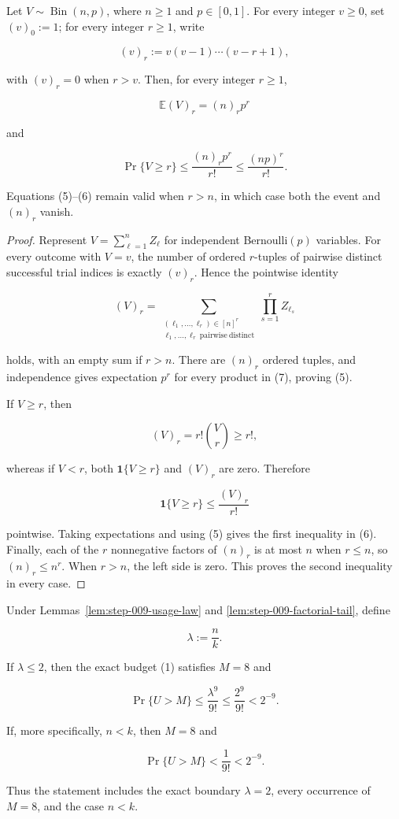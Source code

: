 \begin{lemma}\label{lem:step-009-factorial-tail}
Let \(V\sim\operatorname{Bin}(n,p)\), where \(n\ge1\) and
\(p\in[0,1]\). For every integer \(v\ge0\), set \((v)_0:=1\); for every
integer \(r\ge1\), write

\[
(v)_r:=v(v-1)\cdots(v-r+1),
\]

with \((v)_r=0\) when \(r>v\). Then, for every integer \(r\ge1\),

\[
\mathbb E(V)_r=(n)_r p^r
\tag{5}
\]

and

\[
\Pr\{V\ge r\}
\le \frac{(n)_r p^r}{r!}
\le \frac{(np)^r}{r!}.
\tag{6}
\]

Equations (5)--(6) remain valid when \(r>n\), in which case both the event
and \((n)_r\) vanish.
\end{lemma}

\begin{proof}
Represent \(V=\sum_{\ell=1}^n Z_\ell\) for independent
Bernoulli\((p)\) variables. For every outcome with \(V=v\), the number of
ordered \(r\)-tuples of pairwise distinct successful trial indices is
exactly \((v)_r\). Hence the pointwise identity

\[
(V)_r
=\sum_{\substack{(\ell_1,\ldots,\ell_r)\in[n]^r\\
                    \ell_1,\ldots,\ell_r\ \mathrm{pairwise\ distinct}}}
  \prod_{s=1}^r Z_{\ell_s}
\tag{7}
\]

holds, with an empty sum if \(r>n\). There are \((n)_r\) ordered tuples,
and independence gives expectation \(p^r\) for every product in (7),
proving (5).

If \(V\ge r\), then

\[
(V)_r=r!\binom Vr\ge r!,
\]

whereas if \(V<r\), both \(\mathbf1\{V\ge r\}\) and \((V)_r\) are zero.
Therefore

\[
\mathbf1\{V\ge r\}\le\frac{(V)_r}{r!}
\]

pointwise. Taking expectations and using (5) gives the first inequality in
(6). Finally, each of the \(r\) nonnegative factors of \((n)_r\) is at
most \(n\) when \(r\le n\), so \((n)_r\le n^r\). When \(r>n\), the
left side is zero. This proves the second inequality in every case.
\end{proof}

\begin{lemma}\label{lem:step-009-small-mean}
Under Lemmas~\ref{lem:step-009-usage-law} and
\ref{lem:step-009-factorial-tail}, define

\[
\lambda:=\frac nk.
\tag{8}
\]

If \(\lambda\le2\), then the exact budget (1) satisfies \(M=8\) and

\[
\Pr\{U>M\}
\le\frac{\lambda^9}{9!}
\le\frac{2^9}{9!}
<2^{-9}.
\tag{9}
\]

If, more specifically, \(n<k\), then \(M=8\) and

\[
\Pr\{U>M\}<\frac1{9!}<2^{-9}.
\tag{10}
\]

Thus the statement includes the exact boundary \(\lambda=2\), every
occurrence of \(M=8\), and the case \(n<k\).
\end{lemma}

